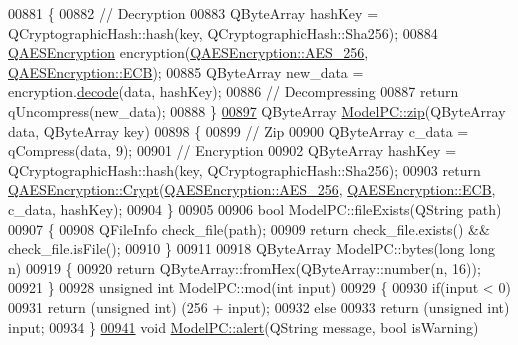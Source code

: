 \begin{DoxyCode}
{00881 \{
00882     \textcolor{comment}{// Decryption}
00883     QByteArray hashKey = QCryptographicHash::hash(key, QCryptographicHash::Sha256);
00884     \hyperlink{class_q_a_e_s_encryption}{QAESEncryption} encryption(\hyperlink{class_q_a_e_s_encryption_abe48208f4f6c7d68e6a10b49b9d0b7bdacde97774ab1d4c609e04b0dd13a1e1f7}{QAESEncryption::AES\_256}, 
      \hyperlink{class_q_a_e_s_encryption_ad3e031c49a3d56566379d75b40b7b255a4ca7f51778e2adf1f464164a0ba8e75e}{QAESEncryption::ECB});
00885     QByteArray new\_data = encryption.\hyperlink{class_q_a_e_s_encryption_a58f972f2b66c2454edd5112495463bba}{decode}(data, hashKey);
00886     \textcolor{comment}{// Decompressing}
00887     \textcolor{keywordflow}{return} qUncompress(new\_data);
00888 \}
\hypertarget{modelpc_8cpp_source.tex_l00897}{}\hyperlink{class_model_p_c_afebbbfa4b07deba4f68fc6dfb50f353f}{00897} QByteArray \hyperlink{class_model_p_c_afebbbfa4b07deba4f68fc6dfb50f353f}{ModelPC::zip}(QByteArray data, QByteArray key)
00898 \{
00899     \textcolor{comment}{// Zip}
00900     QByteArray c\_data = qCompress(data, 9);
00901     \textcolor{comment}{// Encryption}
00902     QByteArray hashKey = QCryptographicHash::hash(key, QCryptographicHash::Sha256);
00903     \textcolor{keywordflow}{return} \hyperlink{class_q_a_e_s_encryption_a43819eeb6a7cb29fbd3cb6ad640dcbdf}{QAESEncryption::Crypt}(\hyperlink{class_q_a_e_s_encryption_abe48208f4f6c7d68e6a10b49b9d0b7bdacde97774ab1d4c609e04b0dd13a1e1f7}{QAESEncryption::AES\_256}, 
      \hyperlink{class_q_a_e_s_encryption_ad3e031c49a3d56566379d75b40b7b255a4ca7f51778e2adf1f464164a0ba8e75e}{QAESEncryption::ECB}, c\_data, hashKey);
00904 \}
00905 
00906 \textcolor{keywordtype}{bool} ModelPC::fileExists(QString path)
00907 \{
00908     QFileInfo check\_file(path);
00909     \textcolor{keywordflow}{return} check\_file.exists() && check\_file.isFile();
00910 \}
00911 
00918 QByteArray ModelPC::bytes(\textcolor{keywordtype}{long} \textcolor{keywordtype}{long} n)
00919 \{
00920     \textcolor{keywordflow}{return} QByteArray::fromHex(QByteArray::number(n, 16));
00921 \}
00928 \textcolor{keywordtype}{unsigned} \textcolor{keywordtype}{int} ModelPC::mod(\textcolor{keywordtype}{int} input)
00929 \{
00930     \textcolor{keywordflow}{if}(input < 0)
00931         \textcolor{keywordflow}{return} (\textcolor{keywordtype}{unsigned} \textcolor{keywordtype}{int}) (256 + input);
00932     \textcolor{keywordflow}{else}
00933         \textcolor{keywordflow}{return} (\textcolor{keywordtype}{unsigned} \textcolor{keywordtype}{int}) input;
00934 \}
\hypertarget{modelpc_8cpp_source.tex_l00941}{}\hyperlink{class_model_p_c_a9079a101d83672aa48fd2dbac797de40}{00941} \textcolor{keywordtype}{void} \hyperlink{class_model_p_c_a9079a101d83672aa48fd2dbac797de40}{ModelPC::alert}(QString message, \textcolor{keywordtype}{bool} isWarning)
}
\end{DoxyCode}
